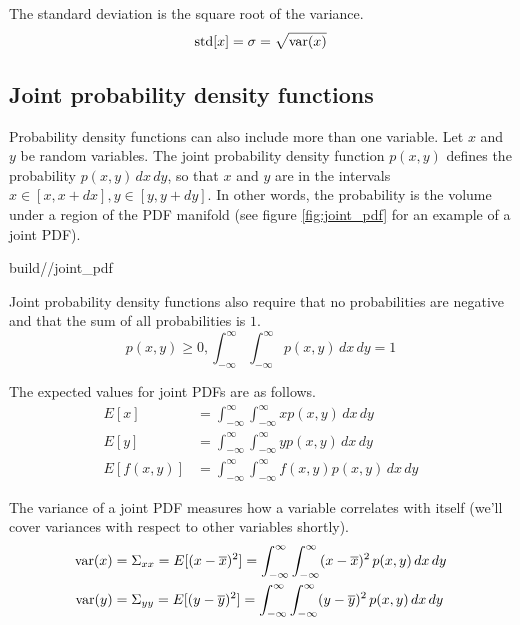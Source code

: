 The standard deviation is the square root of the variance.
\begin{equation*}
  \operatorname{std}[x] = \sigma = \sqrt{\operatorname{var}(x)}
\end{equation*}

\subsection{Joint probability density functions}

Probability density functions can also include more than one variable. Let $x$
and $y$ be random variables. The joint probability density function $p(x, y)$
defines the probability $p(x, y) \,dx \,dy$, so that $x$ and $y$ are in the
intervals $x \in [x, x + dx], y \in [y, y + dy]$. In other words, the
probability is the volume under a region of the PDF manifold (see figure
\ref{fig:joint_pdf} for an example of a joint PDF).
\begin{svg}{build/\chapterpath/joint_pdf}
  \caption{Joint probability density function}
  \label{fig:joint_pdf}
\end{svg}

Joint probability density functions also require that no probabilities are
negative and that the sum of all probabilities is $1$.
\begin{equation*}
  p(x, y) \geq 0, \int_{-\infty}^\infty \int_{-\infty}^{\infty} p(x, y) \,dx
    \,dy = 1
\end{equation*}

The expected values for joint PDFs are as follows.
\begin{align*}
  E[x] &= \int_{-\infty}^\infty \int_{-\infty}^{\infty} x p(x, y) \,dx \,dy \\
  E[y] &= \int_{-\infty}^\infty \int_{-\infty}^{\infty} y p(x, y) \,dx \,dy \\
  E[f(x, y)] &= \int_{-\infty}^\infty \int_{-\infty}^{\infty} f(x, y) p(x, y)
    \,dx \,dy
\end{align*}

The variance of a joint PDF measures how a variable correlates with itself
(we'll cover variances with respect to other variables shortly).
\begin{align*}
  \operatorname{var}(x) &= \Sigma_{xx} = E[(x - \overline{x})^2] =
    \int_{-\infty}^\infty \int_{-\infty}^\infty (x - \overline{x})^2 \,p(x, y)
    \,dx \,dy \\
  \operatorname{var}(y) &= \Sigma_{yy} = E[(y - \overline{y})^2] =
    \int_{-\infty}^\infty \int_{-\infty}^\infty (y - \overline{y})^2 \,p(x, y)
    \,dx \,dy \\
\end{align*}

